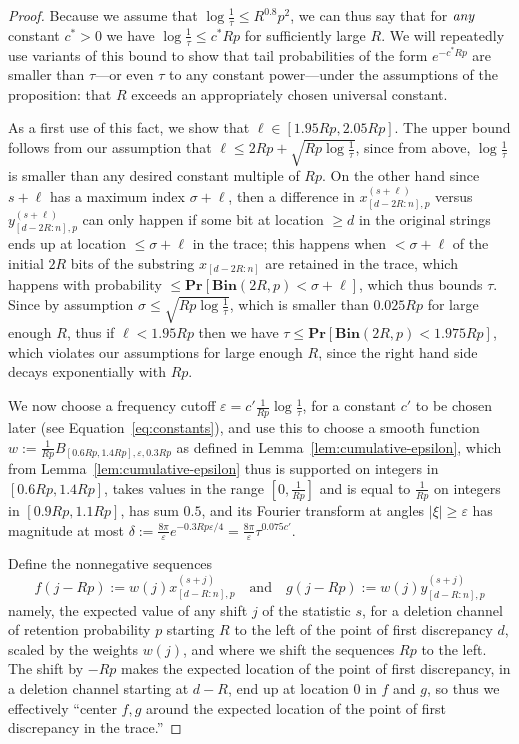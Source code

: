 \documentclass[11pt]{article}
\theoremstyle{plain}
\newcommand{\Bin}[2]{\textbf{Bin}(#1,#2)}
\renewcommand{\Pr}{\textbf{Pr}}
\newcommand{\eps}{\varepsilon}
\begin{document}
\begin{proof}
Because we assume that $\log\frac{1}{\tau}\leq R^{0.8}p^2$, we can thus say that for $\emph{any}$ constant $c^*>0$ we have $\log\frac{1}{\tau}\leq c^* R p$ for sufficiently large $R$. We will repeatedly use variants of this bound to show that tail probabilities of the form $e^{-c^*Rp}$ are smaller than $\tau$---or even $\tau$ to any constant power---under the assumptions of the proposition: that $R$ exceeds an appropriately chosen universal constant.

As a first use of this fact, we show that $\ell\in [1.95Rp,2.05Rp]$. The upper bound follows from our assumption that $\ell\leq 2Rp+ \sqrt{R p\log\frac{1}{\tau}}$, since from above, $\log\frac{1}{\tau}$ is smaller than any desired constant multiple of $Rp$. On the other hand since $s+\ell$ has a maximum index $\sigma+\ell$, then a difference in $x_{[d-2R:n],p}^{(s+\ell)}$ versus $y_{[d-2R:n],p}^{(s+\ell)}$ can only happen if some bit at location $\geq d$ in the original strings ends up at location $\leq \sigma+\ell$ in the trace; this happens when $<\sigma+\ell$ of the initial $2R$ bits of the substring $x_{[d-2R:n]}$ are retained in the trace, which happens with probability $\leq \Pr[\Bin{2R}{p}<\sigma+\ell]$, which thus bounds $\tau$. Since by assumption $\sigma\leq  \sqrt{Rp\log\frac{1}{\tau}}$, which is smaller than $0.025Rp$ for large enough $R$, thus if $\ell<1.95Rp$ then we have $\tau\leq  \Pr[\Bin{2R}{p}<1.975Rp]$, which violates our assumptions for large enough $R$, since the right hand side decays exponentially with $Rp$.

We now choose a frequency cutoff $\eps=c' \frac{1}{Rp}\log\frac{1}{\tau}$, for a constant $c'$ to be chosen later (see Equation~\ref{eq:constants}), and use this to choose a smooth function $w:=\frac{1}{Rp} B_{[0.6Rp,1.4Rp],\eps,0.3Rp}$ as defined in Lemma~\ref{lem:cumulative-epsilon}, which from Lemma~\ref{lem:cumulative-epsilon} thus is supported on integers in $[0.6Rp,1.4Rp]$, takes values in the range $[0,\frac{1}{Rp}]$ and is equal to $\frac{1}{Rp}$ on integers in $[0.9Rp,1.1Rp]$, has sum $0.5$, and its Fourier transform at angles $|\xi|\geq \eps$ has magnitude at most $\delta:=\frac{8\pi}{\eps} e^{-0.3 Rp \eps/4}=\frac{8\pi}{\eps} \tau^{0.075 c'}$.

Define the nonnegative sequences \[f(j-Rp):=w(j) x^{(s+j)}_{[d-R:n],p} \quad\textrm{and}\quad g(j-Rp):=w(j) y^{(s+j)}_{[d-R:n],p}\] namely, the expected value of any shift $j$ of the statistic $s$, for a deletion channel of retention probability $p$ starting $R$ to the left of the point of first discrepancy $d$, scaled by the weights $w(j)$, and where we shift the sequences $Rp$ to the left. The shift by $-Rp$ makes the expected location of the point of first discrepancy, in a deletion channel starting at $d-R$, end up at location 0 in $f$ and $g$, so thus we effectively ``center $f,g$ around the expected location of the point of first discrepancy in the trace.''


\end{proof}
\end{document}
